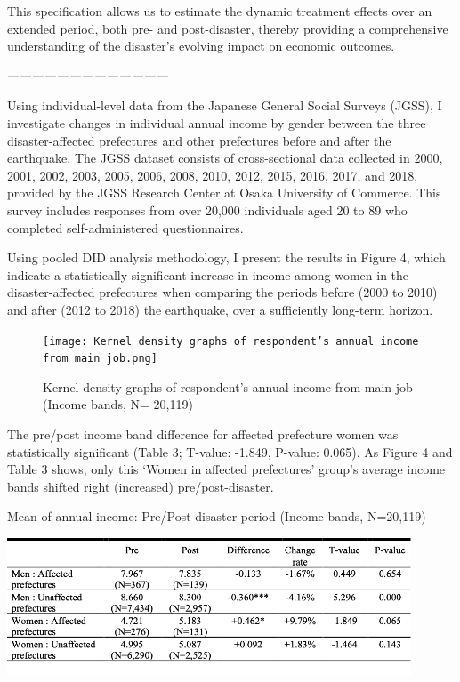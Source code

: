 \documentclass[12pt,halfline,a4paper]{ouparticle}
\begin{document}
This specification allows us to estimate the dynamic treatment effects over an extended period, both pre- and post-disaster, thereby providing a comprehensive understanding of the disaster's evolving impact on economic outcomes.

ーーーーーーーーーーーーー





Using individual-level data from the Japanese General Social Surveys (JGSS), I investigate changes in individual annual income by gender between the three disaster-affected prefectures and other prefectures before and after the earthquake. The JGSS dataset consists of cross-sectional data collected in 2000, 2001, 2002, 2003, 2005, 2006, 2008, 2010, 2012, 2015, 2016, 2017, and 2018, provided by the JGSS Research Center at Osaka University of Commerce. This survey includes responses from over 20,000 individuals aged 20 to 89 who completed self-administered questionnaires. 

Using pooled DID analysis methodology, I present the results in Figure 4, which indicate a statistically significant increase in income among women in the disaster-affected prefectures when comparing the periods before (2000 to 2010) and after (2012 to 2018) the earthquake, over a sufficiently long-term horizon.


\begin{figure}[h!]
    \centering
    \texttt{[image: Kernel density graphs of respondent’s annual income from main job.png]}  %
    \caption{Kernel density graphs of respondent’s annual income from main job (Income bands, N= 20,119)}
    \label{fig:conceptual_model}
\end{figure}

The pre/post income band difference for affected prefecture women was statistically significant (Table 3; T-value: -1.849, P-value: 0.065). As Figure 4 and Table 3 shows, only this ‘Women in affected prefectures’ group's average income bands shifted right (increased) pre/post-disaster.


\begin{table}[h!]
    \centering
    \caption{Mean of annual income: Pre/Post-disaster period (Income bands, N=20,119)}
    \label{tab:annual_income}
    \includegraphics[width=0.9\textwidth]{Annual income table.png}  %
\end{table}
\end{document}
